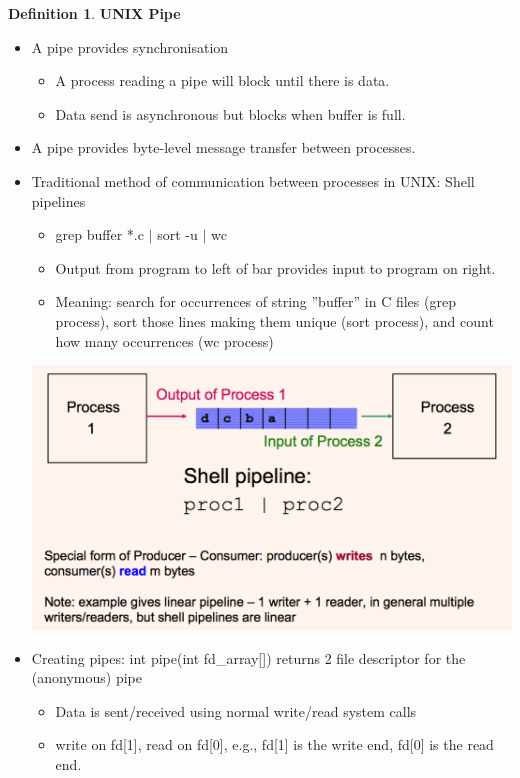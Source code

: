 \documentclass[11pt,a4paper]{article}
\theoremstyle{definition}
\newtheorem{definition}{Definition}[section]
\newenvironment{myitemize}
{ \begin{itemize}
    \setlength{\itemsep}{5pt}
    \setlength{\parskip}{0pt}
    \setlength{\parsep}{0pt}     }
{ \end{itemize}                  }
\begin{document}
\begin{definition}{\textbf{UNIX Pipe}}
	\begin{myitemize}
		\item A pipe provides synchronisation
	\begin{myitemize}
		\item A process reading a pipe will block until there is data.
		\item Data send is asynchronous but blocks when buffer is full.
	\end{myitemize}
	\item A pipe provides byte-level message transfer between processes.
	\item Traditional method of communication between processes in UNIX: \textsf{Shell pipelines}
	\begin{myitemize}
		\item \textsf{grep buffer *.c $|$ sort -u $|$ wc}
		\item Output from program to left of bar provides input to program on right.
		\item Meaning: search for occurrences of string ''buffer'' in C files (grep process), sort those lines making them unique (sort process), and count how many occurrences  (wc process)
	\end{myitemize}
	\begin{center}
		\includegraphics[scale=0.35]{m1/unixPipe}
	\end{center}
	\item Creating pipes: \textsf{int pipe(int fd\_array[])} returns 2 file descriptor for the (anonymous) pipe
	\begin{myitemize}
		\item Data is sent/received using normal write/read system calls
		\item write on \textsf{fd[1]}, read on \textsf{fd[0]}, e.g., \textsf{fd[1]} is the write end, \textsf{fd[0]} is the read end.

\end{myitemize}
\end{myitemize}
\end{definition}
\end{document}
